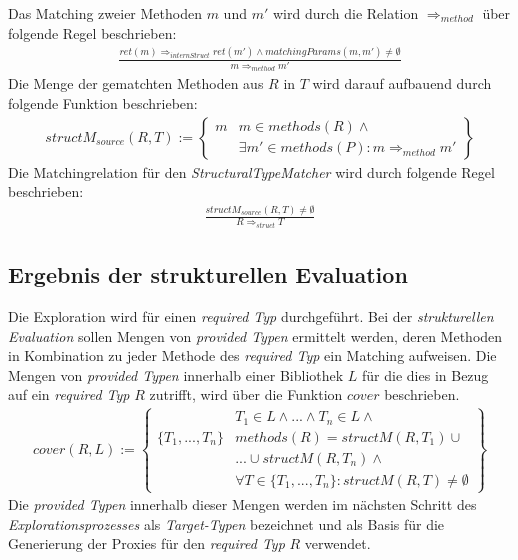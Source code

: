 \noindent
Das Matching zweier Methoden $m$ und $m'$ wird durch die Relation $\Rightarrow_{method}$ über folgende Regel beschrieben:
\begin{gather*}
\frac{\mathit{ret(m)} \Rightarrow_{internStruct} \mathit{ret(m')} \wedge \mathit{matchingParams(m,m')} \neq \emptyset}{m \Rightarrow_{method} m'}
\end{gather*}
\noindent
Die Menge der gematchten Methoden aus $R$ in $T$ wird darauf aufbauend durch folgende Funktion beschrieben:
\begin{gather*}
structM_{source}(R,T) := \left\{ 
				\begin{array}{l|l}
m	& \mathit{m} \in \mathit{methods(R)} \wedge \mathit{ }
\\
	& \exists \mathit{m'} \in \mathit{methods(P)} : m \Rightarrow_{method} m'
				\end{array}
              \right\}
\end{gather*}
\noindent
Die Matchingrelation für den \emph{StructuralTypeMatcher} wird durch folgende Regel beschrieben:
\begin{gather*}
\frac{structM_{source}(R,T) \neq \emptyset}{R \Rightarrow_{struct}T}
\end{gather*}


\subsection{Ergebnis der strukturellen Evaluation}\label{sec_ergStructEval}
Die Exploration wird für einen \emph{required Typ} durchgeführt. Bei der \emph{strukturellen Evaluation} sollen Mengen von \emph{provided Typen} ermittelt werden, deren Methoden in Kombination zu jeder Methode des \emph{required Typ} ein Matching aufweisen. Die Mengen von \emph{provided Typen} innerhalb einer Bibliothek $L$ für die dies in Bezug auf ein \emph{required Typ} $R$ zutrifft, wird über die Funktion $cover$ beschrieben.
\begin{gather*}
cover(R,L) := 
\left\{\begin{array}{l|l}
					& T_1 \in L \wedge \text{...} \wedge T_n \in L 								\wedge \mathit{ }\\
\{T_1,...,T_n\}		& \mathit{methods(R)} = \mathit{structM(R,T_1)}							\cup \mathit{ }\\
					& \texttt{...} \cup \mathit{structM(R, T_n)} 								\wedge \mathit{ }\\
					& \forall T \in \{T_1,...,T_n\}:											\mathit{structM(R,T)} \neq \emptyset
\end{array}\right\}
\end{gather*}
Die \emph{provided Typen} innerhalb dieser Mengen werden im nächsten Schritt des \emph{Explorationsprozesses} als \emph{Target-Typen} bezeichnet und als Basis für die Generierung der Proxies für den \emph{required Typ} $R$ verwendet.

